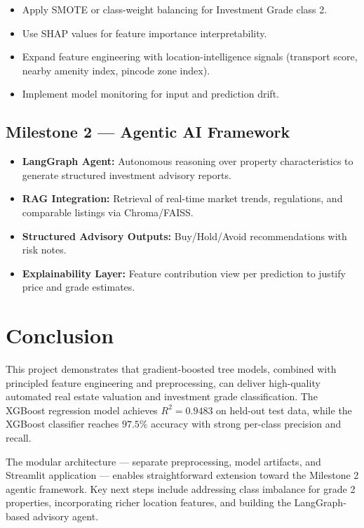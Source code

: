 \documentclass[12pt,a4paper]{article}
\begin{document}
\begin{itemize}[noitemsep]
    \item Apply SMOTE or class-weight balancing for Investment Grade class 2.
    \item Use SHAP values for feature importance interpretability.
    \item Expand feature engineering with location-intelligence signals (transport score,
          nearby amenity index, pincode zone index).
    \item Implement model monitoring for input and prediction drift.
\end{itemize}

\subsection{Milestone 2 --- Agentic AI Framework}

\begin{itemize}[noitemsep]
    \item \textbf{LangGraph Agent:} Autonomous reasoning over property characteristics to generate
          structured investment advisory reports.
    \item \textbf{RAG Integration:} Retrieval of real-time market trends, regulations, and
          comparable listings via Chroma/FAISS.
    \item \textbf{Structured Advisory Outputs:} Buy/Hold/Avoid recommendations with risk notes.
    \item \textbf{Explainability Layer:} Feature contribution view per prediction to justify
          price and grade estimates.
\end{itemize}

\section{Conclusion}

This project demonstrates that gradient-boosted tree models, combined with principled
feature engineering and preprocessing, can deliver high-quality automated real estate
valuation and investment grade classification. The XGBoost regression model achieves
$R^2 = 0.9483$ on held-out test data, while the XGBoost classifier reaches $97.5\%$
accuracy with strong per-class precision and recall.

The modular architecture --- separate preprocessing, model artifacts, and Streamlit
application --- enables straightforward extension toward the Milestone 2 agentic framework.
Key next steps include addressing class imbalance for grade 2 properties, incorporating
richer location features, and building the LangGraph-based advisory agent.
\end{document}
